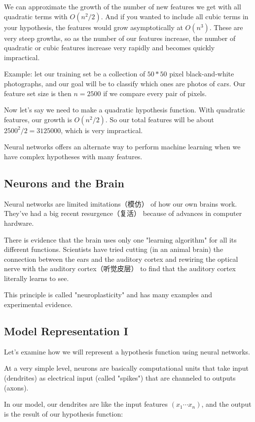 \documentclass{article}
\begin{document}
We can approximate the growth of the number of new features we get with all quadratic terms with $O(n^2/2)$. And if you wanted to include all cubic terms in your hypothesis, the features would grow asymptotically at $O(n^3)$. These are very steep growths, so as the number of our features increase, the number of quadratic or cubic features increase very rapidly and becomes quickly impractical.

Example: let our training set be a collection of $50*50$ pixel black-and-white photographs, and our goal will be to classify which ones are photos of cars. Our feature set size is then $n=2500$ if we compare every pair of pixels.

Now let's say we need to make a quadratic hypothesis function. With quadratic features, our growth is $O(n^2/2)$. So our total features will be about $2500^2/2=3125000$, which is very impractical.

Neural networks offers an alternate way to perform machine learning when we have complex hypotheses with many features.
\subsection{Neurons and the Brain}

Neural networks are limited imitations（模仿） of how our own brains work. They've had a big recent resurgence（复活） because of advances in computer hardware.

There is evidence that the brain uses only one "learning algorithm" for all its different functions. Scientists have tried cutting (in an animal brain) the connection between the ears and the auditory cortex and rewiring the optical nerve with the auditory cortex（听觉皮层） to find that the auditory cortex literally learns to see.

This principle is called "neuroplasticity" and has many examples and experimental evidence.
\subsection{Model Representation I}

Let's examine how we will represent a hypothesis function using neural networks.

At a very simple level, neurons are basically computational units that take input (dendrites) as electrical input (called "spikes") that are channeled to outputs (axons).

In our model, our dendrites are like the input features $(x_1 \cdots x_n)$, and the output is the result of our hypothesis function:
\end{document}
